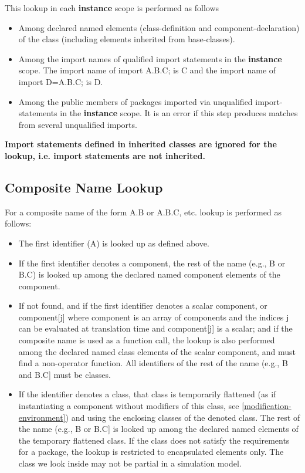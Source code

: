 \documentclass[10pt,a4paper]{report}
\def\doublelabel#1{\label{#1}}
\begin{document}
This lookup in each \textbf{instance} scope is performed as follows

\begin{itemize}
\item
  Among declared named elements (class-definition and
  component-declaration) of the class (including elements inherited from
  base-classes).
\item
  Among the import names of qualified import statements in the
  \textbf{instance} scope. The import name of import A.B.C; is C and the
  import name of import D=A.B.C; is D.
\item
  Among the public members of packages imported via unqualified
  import-statements in the \textbf{instance} scope. It is an error if
  this step produces matches from several unqualified imports.
\end{itemize}

\textbf{Import statements defined in inherited classes are ignored for
the lookup, i.e. import statements are not inherited.}

\subsection{Composite Name Lookup}\doublelabel{composite-name-lookup}

For a composite name of the form A.B or A.B.C, etc. lookup is performed
as follows:

\begin{itemize}
\item
  The first identifier (A) is looked up as defined above.
\item
  If the first identifier denotes a component, the rest of the name
  (e.g., B or B.C) is looked up among the declared named component
  elements of the component.
\item
  If not found, and if the first identifier denotes a scalar component,
  or component[j] where component is an array of components and the
  indices j can be evaluated at translation time and component[j] is
  a scalar; and if the composite name is used as a function call, the
  lookup is also performed among the declared named class elements of
  the scalar component, and must find a non-operator function. All
  identifiers of the rest of the name (e.g., B and B.C] must be
  classes.
\item
  If the identifier denotes a class, that class is temporarily flattened
  (as if instantiating a component without modifiers of this class, see
  \ref{modification-environment}) and using the enclosing classes of the denoted class.
  The rest of the name (e.g., B or B.C{]} is looked up among the
  declared named elements of the temporary flattened class. If the class
  does not satisfy the requirements for a package, the lookup is
  restricted to encapsulated elements only. The class we look inside may
  not be partial in a simulation model.
\end{itemize}
\end{document}
